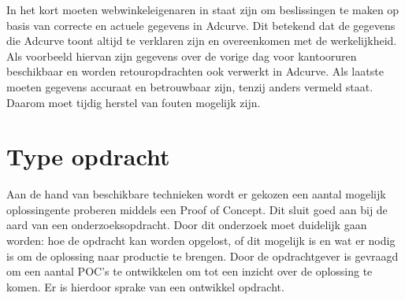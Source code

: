 In het kort moeten webwinkeleigenaren in staat zijn om beslissingen te maken op basis van correcte en actuele gegevens in Adcurve. Dit betekend dat de gegevens die Adcurve toont altijd te verklaren zijn en overeenkomen met de werkelijkheid. Als voorbeeld hiervan zijn gegevens over de vorige dag voor kantooruren beschikbaar en worden retouropdrachten ook verwerkt in Adcurve. Als laatste moeten gegevens accuraat en betrouwbaar zijn, tenzij anders vermeld staat. Daarom moet tijdig herstel van fouten mogelijk zijn.

\section{Type opdracht}

Aan de hand van beschikbare technieken wordt er gekozen een aantal mogelijk oplossingen\newline te proberen middels een Proof of Concept. Dit sluit goed aan bij de aard van een onderzoeksopdracht. Door dit onderzoek moet duidelijk gaan worden: hoe de opdracht kan worden opgelost, of dit mogelijk is en wat er nodig is om de oplossing naar productie te brengen. Door de opdrachtgever is gevraagd om een aantal POC's te ontwikkelen om tot een inzicht over de oplossing te komen. Er is hierdoor sprake van een ontwikkel opdracht.

